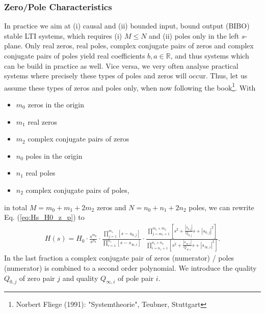 \documentclass[11pt,a4paper,DIV=12]{scrartcl}
\numberwithin{equation}{section}
\numberwithin{figure}{section}
\newcommand{\eq}[1]{Eq. (\ref{#1})} %
\begin{document}
\subsubsection{Zero/Pole Characteristics}
In practice we aim at (i) causal and (ii) bounded input, bound output (BIBO)
stable LTI systems, which requires (i) $M\leq N$ and (ii)
poles only in the left $s$-plane.
%
Only real zeros, real poles, complex conjugate pairs of zeros and
complex conjugate pairs of poles yield
real coefficients $b,a \in \mathbb{R}$, and thus systems which can be build in
practice as well.
%
Vice versa, we very often analyse practical systems where precisely these types
of poles and zeros will occur.
%
Thus, let us assume these types of zeros and poles only, when now following the
book\footnote{Norbert Fliege (1991): "Systemtheorie", Teubner, Stuttgart}.
%
With
\begin{itemize}
\item $m_0$ zeros in the origin
\item $m_1$ real zeros
\item $m_2$ complex conjugate pairs of zeros
\item $n_0$ poles in the origin
\item $n_1$ real poles
\item $n_2$ complex conjugate pairs of poles,
\end{itemize}
in total $M = m_0 + m_1 + 2 m_2$ zeros and $N = n_0 + n_1 + 2 n_2$ poles,
we can rewrite \eq{eq:Hs_H0_z_p} to
\begin{align}
\label{eq:Hs_sorted_for_Bode}
H(s) = H_0
\cdot
\frac
{s^{m_0}}
{s^{n_0}}
\cdot
\frac
{\prod\limits_{j=1}^{m_1} [s-s_{0,j}]}
{\prod\limits_{i=1}^{n_1} [s-s_{\infty,i}]}
\cdot
\frac
{\prod\limits_{j=m_1+1}^{m_1+m_2} [s^2 + \frac{|s_{0,j}|}{Q_{0,j}} s + |s_{0,j}|^2]}
{\prod\limits_{i=n_1+1}^{n_1+n_2} [s^2 + \frac{|s_{\infty,i}|}{Q_{\infty,i}} s + |s_{\infty,i}|^2]}.
\end{align}
%
In the last fraction a complex conjugate pair of zeros (numerator)
/ poles (numerator) is combined to a second order polynomial.
We introduce the quality $Q_{0,j}$ of zero pair $j$ and
quality $Q_{\infty,i}$ of pole pair $i$.
\end{document}
